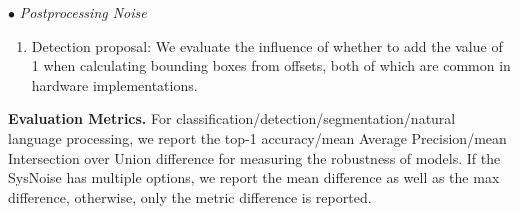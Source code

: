 $\bullet$ \emph{Postprocessing Noise}
    \begin{enumerate}[nosep, leftmargin=1.9em]
        \item Detection proposal: We evaluate the influence of whether to add the value of 1 when calculating bounding boxes from offsets, both of which are common in hardware implementations.
\end{enumerate}



        
    
        


\textbf{Evaluation Metrics.} For classification/detection/segmentation/natural language processing, we report the top-1 accuracy/mean Average Precision/mean Intersection over Union difference for measuring the robustness of models. If the SysNoise has multiple options, we report the mean difference as well as the max difference, otherwise, only the metric difference is reported. 


